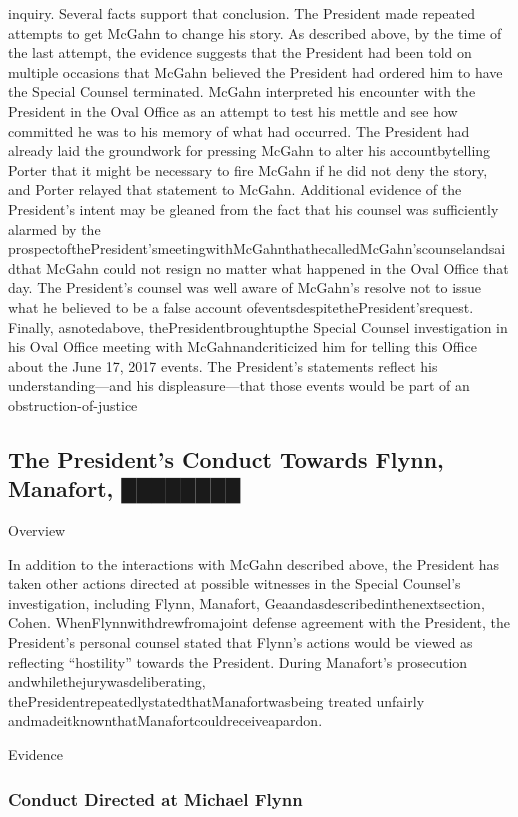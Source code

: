 inquiry.
Several facts support that conclusion.
The President made repeated attempts to get McGahn to change his story.
As described above, by the time of the last attempt, the evidence suggests that the President had been told on multiple occasions that McGahn believed the President had ordered him to have the Special Counsel terminated.
McGahn interpreted his encounter with the President in the Oval Office as an attempt to test his mettle and see how committed he was to his memory of what had occurred.
The President had already laid the groundwork for pressing McGahn to alter his accountbytelling Porter that it might be necessary to fire McGahn if he did not deny the story, and Porter relayed that statement to McGahn.
Additional evidence of the President's intent may be gleaned from the fact that his counsel was sufficiently alarmed by the prospectofthePresident'smeetingwithMcGahnthathecalledMcGahn'scounselandsaidthat McGahn could not resign no matter what happened in the Oval Office that day.
The President's counsel was well aware of McGahn's resolve not to issue what he believed to be a false account ofeventsdespitethePresident'srequest.
Finally, asnotedabove, thePresidentbroughtupthe Special Counsel investigation in his Oval Office meeting with McGahnandcriticized him for telling this Office about the June 17, 2017 events.
The President's statements reflect his understanding—and his displeasure—that those events would be part of an obstruction-of-justice

\subsection{The President's Conduct Towards Flynn, Manafort, ████████}

Overview

In addition to the interactions with McGahn described above, the President has taken other actions directed at possible witnesses in the Special Counsel's investigation, including Flynn, Manafort, Geaandasdescribedinthenextsection, Cohen.
WhenFlynnwithdrewfromajoint defense agreement with the President, the President's personal counsel stated that Flynn's actions would be viewed as reflecting “hostility” towards the President.
During Manafort's prosecution andwhilethejurywasdeliberating, thePresidentrepeatedlystatedthatManafortwasbeing treated unfairly andmadeitknownthatManafortcouldreceiveapardon.

Evidence

\subsubsection{Conduct Directed at Michael Flynn}

